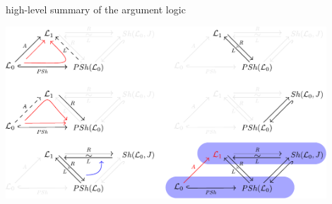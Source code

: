 \begin{frame}
high-level summary of the argument logic

\begin{center}
\includegraphics[width=0.9\textwidth]{fig/arglog.pdf}
\end{center}
\end{frame}